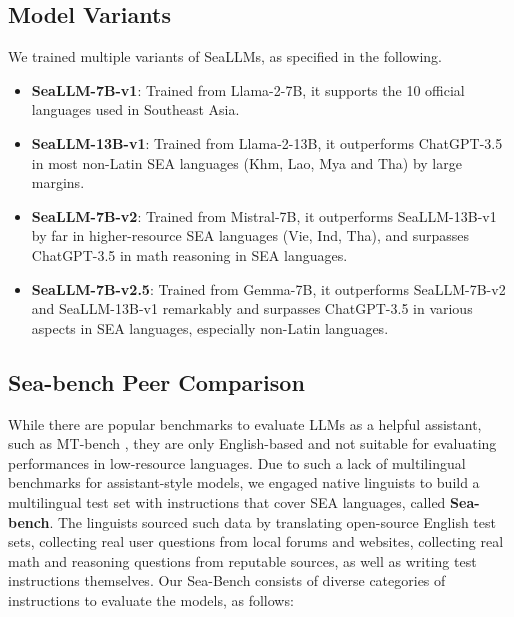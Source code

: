 \subsection{Model Variants}\label{sec:eval:variants}

We trained multiple variants of SeaLLMs, as specified in the following.

\begin{itemize}
    \item \textbf{SeaLLM-7B-v1}: Trained from Llama-2-7B, it supports the 10 official languages used in Southeast Asia.
    \item \textbf{SeaLLM-13B-v1}: Trained from Llama-2-13B, it outperforms ChatGPT-3.5 in most non-Latin SEA languages (Khm, Lao, Mya and Tha) by large margins.
    \item \textbf{SeaLLM-7B-v2}: Trained from Mistral-7B, it outperforms SeaLLM-13B-v1 by far in higher-resource SEA languages (Vie, Ind, Tha), and surpasses ChatGPT-3.5 in math reasoning in SEA languages.
    \item \textbf{SeaLLM-7B-v2.5}: Trained from Gemma-7B, it outperforms SeaLLM-7B-v2 and SeaLLM-13B-v1 remarkably and surpasses ChatGPT-3.5 in various aspects in SEA languages, especially non-Latin languages.
\end{itemize}

\subsection{Sea-bench Peer Comparison}\label{sec:eval:peer_com}

While there are popular benchmarks to evaluate LLMs as a helpful assistant, such as MT-bench \citep{mt_bench_zheng2023judging}, they are only English-based and not suitable for evaluating performances in low-resource languages. Due to such a lack of multilingual benchmarks for assistant-style models, we engaged native linguists to build a multilingual test set with instructions that cover SEA languages, called \textbf{Sea-bench}. The linguists sourced such data by translating open-source English test sets, collecting real user questions from local forums and websites, collecting real math and reasoning questions from reputable sources, as well as writing test instructions themselves. Our Sea-Bench consists of diverse categories of instructions to evaluate the models, as follows:

